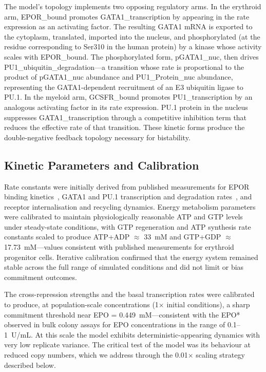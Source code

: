 The model's topology implements two opposing regulatory arms. In the erythroid arm, EPOR\_bound promotes GATA1\_transcription by appearing in the rate expression as an activating factor. The resulting GATA1 mRNA is exported to the cytoplasm, translated, imported into the nucleus, and phosphorylated (at the residue corresponding to Ser310 in the human protein) by a kinase whose activity scales with EPOR\_bound. The phosphorylated form, pGATA1\_nuc, then drives PU1\_ubiquitin\_degradation---a transition whose rate is proportional to the product of pGATA1\_nuc abundance and PU1\_Protein\_nuc abundance, representing the GATA1-dependent recruitment of an E3 ubiquitin ligase to PU.1. In the myeloid arm, GCSFR\_bound promotes PU1\_transcription by an analogous activating factor in its rate expression. PU.1 protein in the nucleus suppresses GATA1\_transcription through a competitive inhibition term that reduces the effective rate of that transition. These kinetic forms produce the double-negative feedback topology necessary for bistability.

\subsection{Kinetic Parameters and Calibration}

Rate constants were initially derived from published measurements for EPOR binding kinetics~\cite{huang2007}, GATA1 and PU.1 transcription and degradation rates~\cite{chickarmane2009}, and receptor internalisation and recycling dynamics. Energy metabolism parameters were calibrated to maintain physiologically reasonable ATP and GTP levels under steady-state conditions, with GTP regeneration and ATP synthesis rate constants scaled to produce ATP+ADP $\approx$ 33~mM and GTP+GDP $\approx$ 17.73~mM---values consistent with published measurements for erythroid progenitor cells. Iterative calibration confirmed that the energy system remained stable across the full range of simulated conditions and did not limit or bias commitment outcomes.

The cross-repression strengths and the basal transcription rates were calibrated to produce, at population-scale concentrations (1$\times$ initial conditions), a sharp commitment threshold near EPO = 0.449~mM---consistent with the EPO* observed in bulk colony assays for EPO concentrations in the range of 0.1--1~U/mL. At this scale the model exhibits deterministic-appearing dynamics with very low replicate variance. The critical test of the model was its behaviour at reduced copy numbers, which we address through the 0.01$\times$ scaling strategy described below.

